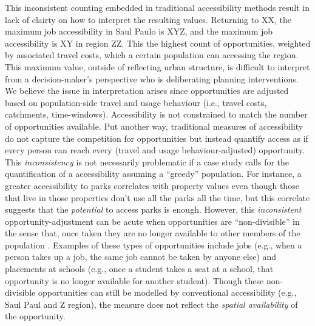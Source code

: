 \documentclass[]{elsarticle} %
\begin{document}
This inconsistent counting embedded in traditional accessibility methods
result in lack of clairty on how to interpret the resulting values.
Returning to XX, the maximum job accessibility in Saul Paulo is XYZ, and
the maximum job accessibility is XY in region ZZ. This the highest count
of opportunities, weighted by associated travel costs, which a certain
population can accessing the region. This maximum value, outside of
reflecting urban structure, is difficult to interpret from a
decision-maker's perspective who is deliberating planning interventions.
We believe the issue in interpretation arises since opportunities are
adjusted based on population-side travel and usage behaviour (i.e.,
travel costs, catchments, time-windows). Accessibility is not
constrained to match the number of opportunities available. Put another
way, traditional measures of accessibility do not capture the
competition for opportunities but instead quantify access as if every
person can reach every (travel and usage behaviour-adjusted)
opportunity. This \emph{inconsistency} is not necessarily problematic if
a case study calls for the quantification of a accessibility assuming a
``greedy'' population. For instance, a greater accessibility to parks
correlates with property values even though those that live in those
properties don't use all the parks all the time, but this correlate
suggests that the \emph{potential} to access parks is enough. However,
this \emph{inconsistent} opportunity-adjustment can be acute when
opportunities are ``non-divisible'' in the sense that, once taken they
are no longer available to other members of the population \citep[also
discussed by][]{geurs2004}. Examples of these types of opportunities
include jobs (e.g., when a person takes up a job, the same job cannot be
taken by anyone else) and placements at schools (e.g., once a student
takes a seat at a school, that opportunity is no longer available for
another student). Though these non-divisible opportunities can still be
modelled by conventional accessibility (e.g., Saul Paul and Z region),
the measure does not reflect the \emph{spatial availability} of the
opportunity.
\end{document}
